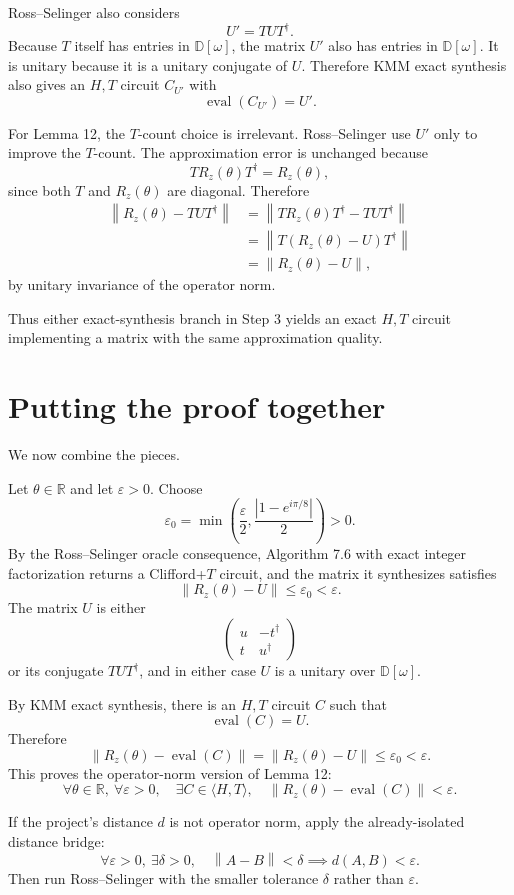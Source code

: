 \documentclass[11pt]{article}
\newcommand{\R}{\mathbb R}
\newcommand{\Dw}{\mathbb D[\omega]}
\newcommand{\eps}{\varepsilon}
\newcommand{\opnorm}[1]{\left\|#1\right\|}
\newcommand{\mat}[1]{\begin{pmatrix}#1\end{pmatrix}}
\begin{document}
Ross--Selinger also considers
\[
  U'=TUT^\dagger.
\]
Because $T$ itself has entries in $\Dw$, the matrix $U'$ also has entries in $\Dw$. It is unitary because it is a unitary conjugate of $U$. Therefore KMM exact synthesis also gives an $H,T$ circuit $C_{U'}$ with
\[
  \operatorname{eval}(C_{U'})=U'.
\]

For Lemma 12, the $T$-count choice is irrelevant. Ross--Selinger use $U'$ only to improve the $T$-count. The approximation error is unchanged because
\[
  T R_z(\theta)T^\dagger=R_z(\theta),
\]
since both $T$ and $R_z(\theta)$ are diagonal. Therefore
\begin{align*}
  \opnorm{R_z(\theta)-TUT^\dagger}
  &=\opnorm{TR_z(\theta)T^\dagger-TUT^\dagger}\\
  &=\opnorm{T(R_z(\theta)-U)T^\dagger}\\
  &=\opnorm{R_z(\theta)-U},
\end{align*}
by unitary invariance of the operator norm.

Thus either exact-synthesis branch in Step 3 yields an exact $H,T$ circuit implementing a matrix with the same approximation quality.

\section{Putting the proof together}

We now combine the pieces.

Let $\theta\in\R$ and let $\eps>0$. Choose
\[
  \eps_0=\min\left(\frac{\eps}{2},\frac{|1-e^{i\pi/8}|}{2}\right)>0.
\]
By the Ross--Selinger oracle consequence, Algorithm 7.6 with exact integer factorization returns a Clifford+$T$ circuit, and the matrix it synthesizes satisfies
\[
  \opnorm{R_z(\theta)-U}\le \eps_0<\eps.
\]
The matrix $U$ is either
\[
  \mat{u&-t^\dagger\\t&u^\dagger}
\]
or its conjugate $TUT^\dagger$, and in either case $U$ is a unitary over $\Dw$.

By KMM exact synthesis, there is an $H,T$ circuit $C$ such that
\[
  \operatorname{eval}(C)=U.
\]
Therefore
\[
  \opnorm{R_z(\theta)-\operatorname{eval}(C)}
  =
  \opnorm{R_z(\theta)-U}
  \le \eps_0<\eps.
\]
This proves the operator-norm version of Lemma 12:
\[
  \forall \theta\in\R,\ \forall \eps>0,
  \quad
  \exists C\in\langle H,T\rangle,
  \quad
  \opnorm{R_z(\theta)-\operatorname{eval}(C)}<\eps.
\]

If the project's distance $d$ is not operator norm, apply the already-isolated distance bridge:
\[
  \forall \eps>0,\ \exists \delta>0,
  \quad
  \opnorm{A-B}<\delta\implies d(A,B)<\eps.
\]
Then run Ross--Selinger with the smaller tolerance $\delta$ rather than $\eps$.
\end{document}
